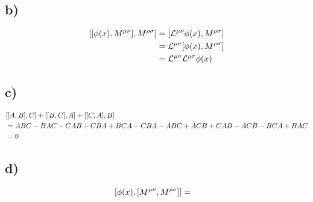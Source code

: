 \documentclass[twoside]{amsart}
\numberwithin{equation}{section}
\begin{document}
\subsection*{\textbf{b)}}

\begin{align*}
    \comm{\comm{\phi\qty(x)}{M^{\mu\nu}}}{M^{\rho\sigma}}&=\comm{{\mathcal L}^{\mu\nu}\phi\qty(x)}{M^{\rho\sigma}}\\
    &={\mathcal L}^{\mu\nu}\comm{\phi\qty(x)}{M^{\rho\sigma}}\\
    &={\mathcal L}^{\mu\nu}{\mathcal L}^{\rho\sigma}\phi\qty(x)
\end{align*}

\subsection*{\textbf{c)}}

\begin{align*}
    &\comm{\comm{A}{B}}{C}+\comm{\comm{B}{C}}{A}+\comm{\comm{C}{A}}{B}\\
    &=ABC-BAC-CAB+CBA+BCA-CBA-ABC+ACB+CAB-ACB-BCA+BAC\\
    &=0
\end{align*}

\subsection*{\textbf{d)}}

\begin{align*}
    \comm{\phi\qty(x)}{\comm{M^{\mu\nu}}{M^{\rho\sigma}}}&=
\end{align*}
\end{document}
